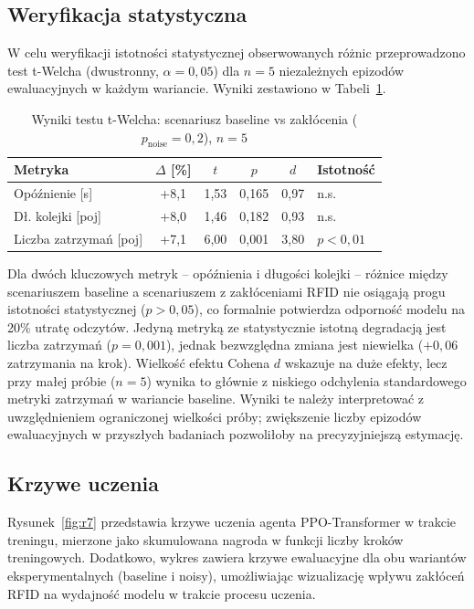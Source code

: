 \documentclass[10pt,a4paper]{article}
\begin{document}
\subsection{Weryfikacja statystyczna}

W celu weryfikacji istotności statystycznej obserwowanych różnic przeprowadzono test t-Welcha (dwustronny, $\alpha = 0{,}05$) dla $n = 5$ niezależnych epizodów ewaluacyjnych w każdym wariancie. Wyniki zestawiono w Tabeli~\ref{tab:stat}.

\begin{table}[H]
\centering
\footnotesize
\caption{Wyniki testu t-Welcha: scenariusz baseline vs zakłócenia ($p_{\text{noise}} = 0{,}2$), $n = 5$}
\label{tab:stat}
\begin{tabular}{lccccl}
\toprule
Metryka & $\Delta$ [\%] & $t$ & $p$ & $d$ & Istotność \\
\midrule
Opóźnienie [s] & +8,1 & 1,53 & 0,165 & 0,97 & n.s. \\
Dł. kolejki [poj] & +8,0 & 1,46 & 0,182 & 0,93 & n.s. \\
Liczba zatrzymań [poj] & +7,1 & 6,00 & 0,001 & 3,80 & $p < 0{,}01$ \\
\bottomrule
\end{tabular}
\end{table}

Dla dwóch kluczowych metryk -- opóźnienia i długości kolejki -- różnice między scenariuszem baseline a scenariuszem z zakłóceniami RFID nie osiągają progu istotności statystycznej ($p > 0{,}05$), co formalnie potwierdza odporność modelu na 20\% utratę odczytów. Jedyną metryką ze statystycznie istotną degradacją jest liczba zatrzymań ($p = 0{,}001$), jednak bezwzględna zmiana jest niewielka ($+0{,}06$ zatrzymania na krok). Wielkość efektu Cohena $d$ wskazuje na duże efekty, lecz przy małej próbie ($n = 5$) wynika to głównie z niskiego odchylenia standardowego metryki zatrzymań w wariancie baseline. Wyniki te należy interpretować z uwzględnieniem ograniczonej wielkości próby; zwiększenie liczby epizodów ewaluacyjnych w przyszłych badaniach pozwoliłoby na precyzyjniejszą estymację.

\subsection{Krzywe uczenia}

Rysunek~\ref{fig:r7} przedstawia krzywe uczenia agenta PPO-Transformer w trakcie treningu, mierzone jako skumulowana nagroda w funkcji liczby kroków treningowych. Dodatkowo, wykres zawiera krzywe ewaluacyjne dla obu wariantów eksperymentalnych (baseline i noisy), umożliwiając wizualizację wpływu zakłóceń RFID na wydajność modelu w trakcie procesu uczenia.
\end{document}
